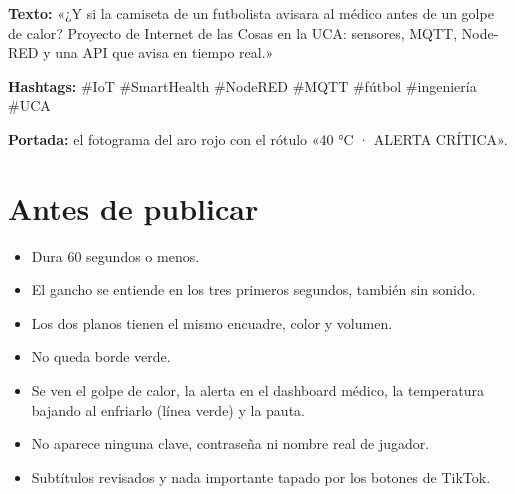 \documentclass[11pt,a4paper]{article}
\begin{document}
\textbf{Texto:} «¿Y si la camiseta de un futbolista avisara al médico antes de un golpe de calor? Proyecto de Internet de las Cosas en la UCA: sensores, MQTT, Node-RED y una API que avisa en tiempo real.»

\textbf{Hashtags:} \#IoT \#SmartHealth \#NodeRED \#MQTT \#fútbol \#ingeniería \#UCA

\textbf{Portada:} el fotograma del aro rojo con el rótulo «40 °C · ALERTA CRÍTICA».

\section*{Antes de publicar}

\begin{itemize}[nosep]
  \item[$\square$] Dura 60 segundos o menos.
  \item[$\square$] El gancho se entiende en los tres primeros segundos, también sin sonido.
  \item[$\square$] Los dos planos tienen el mismo encuadre, color y volumen.
  \item[$\square$] No queda borde verde.
  \item[$\square$] Se ven el golpe de calor, la alerta en el dashboard médico, la temperatura bajando al enfriarlo (línea verde) y la pauta.
  \item[$\square$] No aparece ninguna clave, contraseña ni nombre real de jugador.
  \item[$\square$] Subtítulos revisados y nada importante tapado por los botones de TikTok.
\end{itemize}
\end{document}
